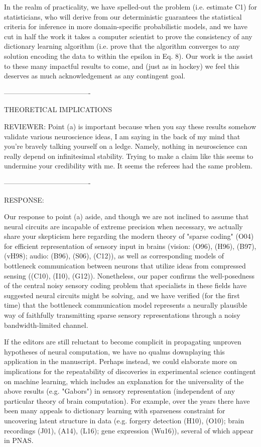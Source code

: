 In the realm of practicality, we have spelled-out the problem (i.e. estimate C1) for statisticians, who will derive from our deterministic guarantees the statistical criteria for inference in more domain-specific probabilistic models, and we have cut in half the work it takes a computer scientist to prove the consistency of any dictionary learning algorithm (i.e. prove that the algorithm converges to any solution encoding the data to within the epsilon in Eq. 8). Our work is the assist to these many impactful results to come, and (just as in hockey) we feel this deserves as much acknowledgement as any contingent goal.

-------------------------------------



THEORETICAL IMPLICATIONS

REVIEWER: 
Point (a) is important because when you say these results somehow
validate various neuroscience ideas, I am saying in the back of my mind
that you're bravely talking yourself on a ledge. Namely, nothing in
neuroscience can really depend on infinitesimal stability. Trying to make a
claim like this seems to undermine your credibility with me. It seems the
referees had the same problem.

-------------------------------------

RESPONSE:

Our response to point (a) aside, and though we are not inclined to assume that neural circuits are incapable of extreme precision when necessary, we actually share your skepticism here regarding the modern theory of "sparse coding" (O04) for efficient representation of sensory input in brains (vision: (O96), (H96), (B97), (vH98); audio: (B96), (S06), (C12)), as well as corresponding models of bottleneck communication between neurons that utilize ideas from compressed sensing ((C10), (I10), (G12)). Nonetheless, our paper confirms the well-posedness of the central noisy sensory coding problem that specialists in these fields have suggested neural circuits might be solving, and we have verified (for the first time) that the bottleneck communication model represents a neurally plausible way of faithfully transmitting sparse sensory representations through a noisy bandwidth-limited channel.

If the editors are still reluctant to become complicit in propagating unproven hypotheses of neural computation, we have no qualms downplaying this application in the manuscript. Perhaps instead, we could elaborate more on implications for the repeatability of discoveries in experimental science contingent on machine learning, which includes an explanation for the universality of the above results (e.g. "Gabors") in sensory representation (independent of any particular theory of brain computation). For example, over the years there have been many appeals to dictionary learning with sparseness constraint for uncovering latent structure in data (e.g. forgery detection (H10), (O10); brain recordings (J01), (A14), (L16); gene expression (Wu16)), several of which appear in PNAS. 


